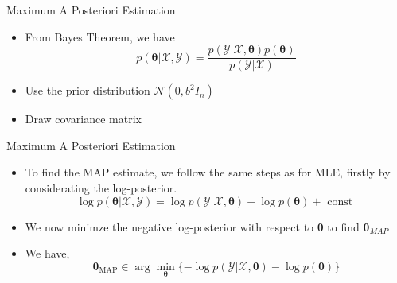 \documentclass{beamer}
\begin{document}
\begin{frame}{Maximum A Posteriori Estimation}
\begin{itemize}[<+->]
\item From Bayes Theorem, we have 
\begin{equation*}
p(\boldsymbol{\theta} | \mathcal{X}, \mathcal{Y})=\frac{p(\mathcal{Y} | \mathcal{X}, \boldsymbol{\theta}) p(\boldsymbol{\theta})}{p(\mathcal{Y} | \mathcal{X})}
\end{equation*}
\item Use the prior distribution $\mathcal{N}(0, b^{2} I_{n})$
\item Draw covariance matrix
\end{itemize}


\end{frame}
\begin{frame}{Maximum A Posteriori Estimation}
\begin{itemize}[<+->]
\item To find the MAP estimate, we follow the same steps as for MLE, firstly by considerating the log-posterior.
\begin{equation*}
    \log p(\boldsymbol{\theta} | \mathcal{X, Y}) = \log p(\mathcal{Y | X}, \boldsymbol{\theta}) + \log p(\boldsymbol{\theta}) + \text{ const }
\end{equation*}
\item We now minimze the negative log-posterior with respect to $\boldsymbol{\theta}$ to find $\boldsymbol{\theta}_{MAP}$
\item We have, 
\begin{equation*}
\boldsymbol{\theta}_{\mathrm{MAP}} \in \arg \min _{\boldsymbol{\theta}}\{-\log p(\mathcal{Y} | \mathcal { X }, \boldsymbol{\theta})-\log p(\boldsymbol{\theta})\}
\end{equation*}
\end{itemize}


\end{frame}
\end{document}
